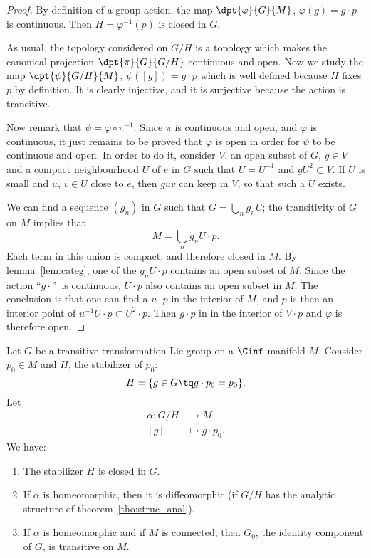 \begin{proof}
By definition of a group action, the map $\dpt{\varphi}{G}{M}$, $\varphi(g)=g\cdot p$ is continuous. Then $H=\varphi^{-1}(p)$ is closed in $G$.

As usual, the topology considered on $G/H$ is a topology which makes the canonical projection $\dpt{\pi}{G}{G/H}$ continuous and open. Now we study the map $\dpt{\psi}{G/H}{M}$, $\psi([g])=g\cdot p$ which is well defined because $H$ fixes $p$ by definition. It is clearly injective, and it is surjective because the action is transitive.

Now remark that $\psi=\varphi\circ\pi^{-1}$. Since $\pi$ is continuous and open, and $\varphi$ is continuous, it just remains to be proved that $\varphi$ is open in order for $\psi$ to be continuous and open. In order to do it, consider $V$, an open subset of $G$, $g\in V$ and a compact neighbourhood $U$ of $e$ in $G$ such that $U=U^{-1}$ and $gU^2\subset V$. If $U$ is small and $u$, $v\in U$ close to $e$, then $guv$ can keep in $V$, so that such a $U$ exists.

We can find a sequence $(g_n)$ in $G$ such that $G=\bigcup_ng_nU$; the transitivity of $G$ on $M$ implies that
\[
  M=\bigcup_ng_nU\cdot p.
\]
Each term in this union is compact, and therefore closed in $M$. By lemma~\ref{lem:categ}, one of the $g_nU\cdot p$ contains an open subset of $M$. Since the action ``$g\cdot$''\ is continuous, $U\cdot p$ also contains an open subset in $M$. The conclusion is that one can find a $u\cdot p$ in the interior of $M$, and $p$ is then an interior point of $u^{-1} U\cdot p\subset U^2\cdot p$. Then $g\cdot p$ in in the interior of $V\cdot p$ and $\varphi$ is therefore open.
\end{proof}

\begin{proposition}
Let $G$ be a transitive transformation Lie group on a $\Cinf$ manifold $M$. Consider $p_0\in M$ and $H$, the stabilizer of $p_{0}$:
\[
  H=\{ g\in G\tq g\cdot p_0=p_0 \}.
\]
Let
\begin{equation}
\begin{aligned}
 \alpha\colon G/H&\to M \\
[g]&\mapsto g\cdot p_{0}.
\end{aligned}
\end{equation}
We have:
\begin{enumerate}
\item The stabilizer $H$ is closed in $G$.
\item If $\alpha$ is homeomorphic, then it is diffeomorphic (if $G/H$ has the analytic structure of theorem~\ref{tho:struc_anal}).
\item If $\alpha$ is homeomorphic and if $M$ is connected, then $G_0$, the identity component of $G$, is transitive on $M$.
\end{enumerate}
\label{propHelgason4.3}
\end{proposition}

